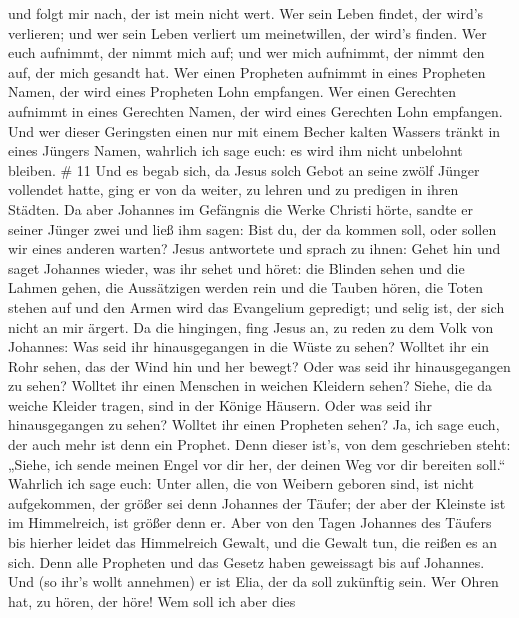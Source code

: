 und folgt mir nach, der ist mein nicht wert.  Wer sein
Leben findet, der wird's verlieren; und wer sein Leben verliert um
meinetwillen, der wird's finden.  Wer euch aufnimmt, der
nimmt mich auf; und wer mich aufnimmt, der nimmt den auf, der mich
gesandt hat.  Wer einen Propheten aufnimmt in eines
Propheten Namen, der wird eines Propheten Lohn empfangen. Wer einen
Gerechten aufnimmt in eines Gerechten Namen, der wird eines Gerechten
Lohn empfangen.  Und wer dieser Geringsten einen nur mit
einem Becher kalten Wassers tränkt in eines Jüngers Namen, wahrlich ich
sage euch: es wird ihm nicht unbelohnt bleiben. \# 11  Und
es begab sich, da Jesus solch Gebot an seine zwölf Jünger vollendet
hatte, ging er von da weiter, zu lehren und zu predigen in ihren
Städten.  Da aber Johannes im Gefängnis die Werke Christi
hörte, sandte er seiner Jünger zwei  und ließ ihm sagen:
Bist du, der da kommen soll, oder sollen wir eines anderen warten?
 Jesus antwortete und sprach zu ihnen: Gehet hin und saget
Johannes wieder, was ihr sehet und höret:  die Blinden sehen
und die Lahmen gehen, die Aussätzigen werden rein und die Tauben hören,
die Toten stehen auf und den Armen wird das Evangelium gepredigt;
 und selig ist, der sich nicht an mir ärgert. 
Da die hingingen, fing Jesus an, zu reden zu dem Volk von Johannes: Was
seid ihr hinausgegangen in die Wüste zu sehen? Wolltet ihr ein Rohr
sehen, das der Wind hin und her bewegt?  Oder was seid ihr
hinausgegangen zu sehen? Wolltet ihr einen Menschen in weichen Kleidern
sehen? Siehe, die da weiche Kleider tragen, sind in der Könige Häusern.
 Oder was seid ihr hinausgegangen zu sehen? Wolltet ihr
einen Propheten sehen? Ja, ich sage euch, der auch mehr ist denn ein
Prophet.  Denn dieser ist's, von dem geschrieben steht:
„Siehe, ich sende meinen Engel vor dir her, der deinen Weg vor dir
bereiten soll.``  Wahrlich ich sage euch: Unter allen, die
von Weibern geboren sind, ist nicht aufgekommen, der größer sei denn
Johannes der Täufer; der aber der Kleinste ist im Himmelreich, ist
größer denn er.  Aber von den Tagen Johannes des Täufers
bis hierher leidet das Himmelreich Gewalt, und die Gewalt tun, die
reißen es an sich.  Denn alle Propheten und das Gesetz
haben geweissagt bis auf Johannes.  Und (so ihr's wollt
annehmen) er ist Elia, der da soll zukünftig sein.  Wer
Ohren hat, zu hören, der höre!  Wem soll ich aber dies
